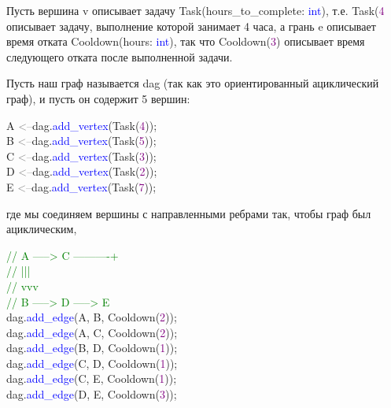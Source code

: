 \vspace{\baselineskip}

Пусть вершина { v} описывает задачу {  Task(hours\_to\_complete: \textcolor{Blue}{int})}, т.е. { Task(\textcolor{Purple}{4}} описывает задачу, выполнение которой занимает 4 часа, а грань { e} описывает время отката { Cooldown(hours: \textcolor{Blue}{int})}, так что { Cooldown(\textcolor{Purple}{3})} описывает время следующего отката после выполненной задачи.

\vspace{\baselineskip}

Пусть наш граф называется dag (так как это ориентированный ациклический граф), и пусть он содержит 5 вершин:

\begin{tcolorbox}
    {
    A \textcolor{Gray}{<--}dag.\textcolor{Blue}{add\_vertex}(Task(\textcolor{Purple}{4})); \\
    B \textcolor{Gray}{<--}dag.\textcolor{Blue}{add\_vertex}(Task(\textcolor{Purple}{5})); \\
    C \textcolor{Gray}{<--}dag.\textcolor{Blue}{add\_vertex}(Task(\textcolor{Purple}{3})); \\
    D \textcolor{Gray}{<--}dag.\textcolor{Blue}{add\_vertex}(Task(\textcolor{Purple}{2})); \\
    E \textcolor{Gray}{<--}dag.\textcolor{Blue}{add\_vertex}(Task(\textcolor{Purple}{7}));}
\end{tcolorbox}

где мы соединяем вершины с направленными ребрами так, чтобы граф был ациклическим,

\begin{tcolorbox}
{ 
\textcolor{Green}
{// A -----> C ----------+ \\
// |\hspace{1.3cm}|\hspace{1.3cm}| \\
// v\hspace{1.3cm}v\hspace{1.3cm}v \\
// B -----> D -----> E} \\
dag.\textcolor{Blue}{add\_edge}(A, B, Cooldown(\textcolor{Purple}{2})); \\
dag.\textcolor{Blue}{add\_edge}(A, C, Cooldown(\textcolor{Purple}{2})); \\
dag.\textcolor{Blue}{add\_edge}(B, D, Cooldown(\textcolor{Purple}{1})); \\
dag.\textcolor{Blue}{add\_edge}(C, D, Cooldown(\textcolor{Purple}{1})); \\
dag.\textcolor{Blue}{add\_edge}(C, E, Cooldown(\textcolor{Purple}{1})); \\
dag.\textcolor{Blue}{add\_edge}(D, E, Cooldown(\textcolor{Purple}{3}));
}\end{tcolorbox}

